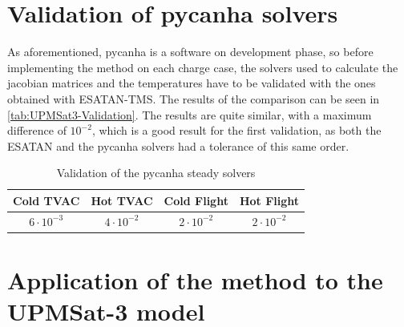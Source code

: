     \section{Validation of pycanha solvers}
    As aforementioned, pycanha is a software on development phase, so before implementing the method on each charge case, the solvers used to calculate the jacobian matrices and the temperatures have to be validated with the ones obtained with ESATAN-TMS. The results of the comparison can be seen in \autoref{tab:UPMSat3-Validation}. The results are quite similar, with a maximum difference of $10^{-2}$, which is a good result for the first validation, as both the ESATAN and the pycanha solvers had a tolerance of this same order.
    \begin{table}[H]
    \centering
    \caption{Validation of the pycanha steady solvers}
    \label{tab:UPMSat3-Validation}
    \begin{tabular}{c c c c}
        \toprule
        \textbf{Cold TVAC} & \textbf{Hot TVAC} & \textbf{Cold Flight} & \textbf{Hot Flight} \\
        \midrule
        $6\cdot 10^{-3}$ & $4\cdot 10^{-2}$ & $2\cdot 10^{-2}$ & $2\cdot 10^{-2}$ \\
        \bottomrule
    \end{tabular}
    \end{table}

    \section{Application of the method to the UPMSat-3 model}
